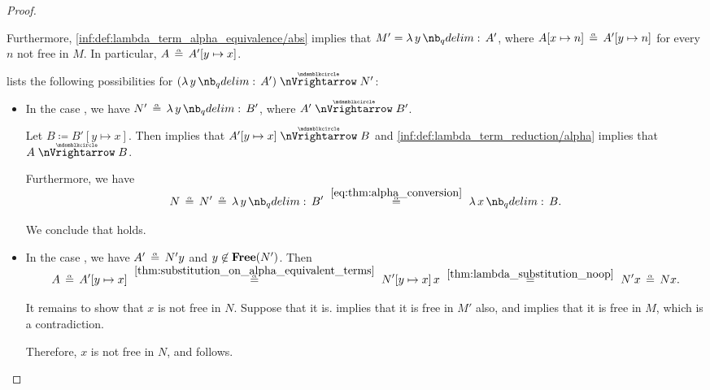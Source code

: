 \begin{proof}
\begin{itemize}
    Furthermore, \ref{inf:def:lambda_term_alpha_equivalence/abs} implies that \( M' = \qabs y A' \), where \( A[x \mapsto n] \aequiv A'[y \mapsto n] \) for every \( n \) not free in \( M \). In particular, \( A \aequiv A'[y \mapsto x] \).

     lists the following possibilities for \( (\qabs y A') \ppred N' \):
    \begin{itemize}
      \item In the case , we have \( N' \aequiv \qabs y B' \), where \( A' \ppred B' \).

      Let \( B \coloneqq B'[y \mapsto x] \). Then  implies that \( A'[y \mapsto x] \ppred B \) and \ref{inf:def:lambda_term_reduction/alpha} implies that \( A \ppred B \).

      Furthermore, we have
      \begin{equation*}
        N
        \aequiv
        N'
        \aequiv
        \qabs y B'
        \reloset {\eqref{eq:thm:alpha_conversion}} \aequiv
        \qabs x B.
      \end{equation*}

      We conclude that  holds.

      \item In the case , we have \( A' \aequiv N'y \) and \( y \not\in \op*{Free}(N') \). Then
      \begin{equation*}
        A
        \aequiv
        A'[y \mapsto x]
        \reloset {\ref{thm:substitution_on_alpha_equivalent_terms}} \aequiv
        N'[y \mapsto x] \thinspace x
        \reloset {\ref{thm:lambda_substitution_noop}} =
        N' x
        \aequiv
        N x.
      \end{equation*}

      It remains to show that \( x \) is not free in \( N \). Suppose that it is.  implies that it is free in \( M' \) also, and  implies that it is free in \( M \), which is a contradiction.

      Therefore, \( x \) is not free in \( N \), and  follows.
    \end{itemize}
  \end{itemize}
\end{proof}

